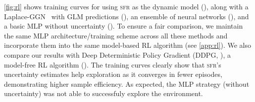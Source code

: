 \documentclass{article}
\newcommand{\our}{\textsc{sfr}\xspace}
\begin{document}

\cref{fig:rl} shows training curves for using \our as the dynamic model (), along with a Laplace-GGN~\cite{todo} with GLM predictions (), an ensemble of neural networks (), and a basic MLP without uncertainty (). To ensure a fair comparison, we maintain the same MLP architecture/training scheme across all these methods and incorporate them into the same model-based RL algorithm (see \cref{app:rl}). We also compare our results with Deep Deterministic Policy Gradient (DDPG, \cite{lillicrapContinuousControlDeep2016}), a model-free RL algorithm ().
%
The training curves clearly show that \our's uncertainty estimates help exploration as it converges in fewer episodes, demonstrating higher sample efficiency. As expected, the MLP strategy (without uncertainty) was not able to successfuly explore the environment.






\end{document}
